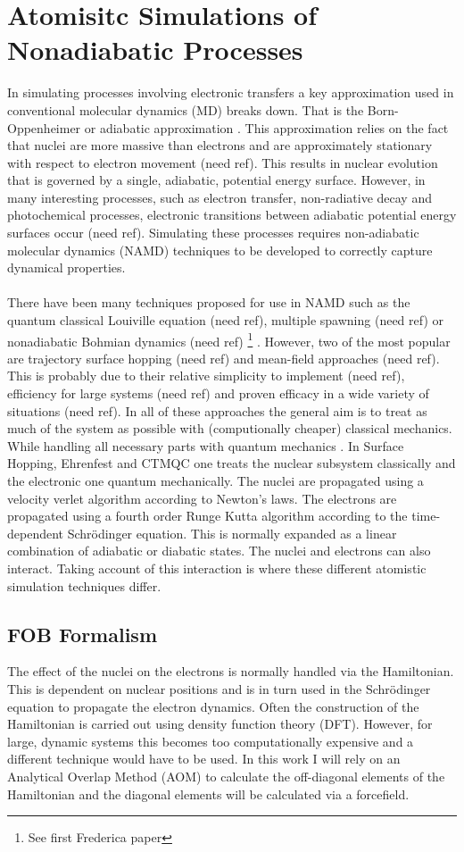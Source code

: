\section{Atomisitc Simulations of Nonadiabatic Processes}
In simulating processes involving electronic transfers a key approximation used in conventional molecular dynamics (MD) breaks down. That is the Born-Oppenheimer or adiabatic approximation \cite{john_c._tully_nonadiabatic_nodate}. This approximation relies on the fact that nuclei are more massive than electrons and are approximately stationary with respect to electron movement (need ref). This results in nuclear evolution that is governed by a single, adiabatic, potential energy surface. However, in many interesting processes, such as electron transfer, non-radiative decay and photochemical processes, electronic transitions between adiabatic potential energy surfaces occur (need ref). Simulating these processes requires non-adiabatic molecular dynamics (NAMD) techniques to be developed to correctly capture dynamical properties.
\\\\
There have been many techniques proposed for use in NAMD such as the quantum classical Louiville equation (need ref), multiple spawning (need ref) or nonadiabatic Bohmian dynamics (need ref) \footnote{See first Frederica paper} . However, two of the most popular are trajectory surface hopping (need ref) and mean-field approaches (need ref). This is probably due to their relative simplicity to implement (need ref), efficiency for large systems (need ref) and proven efficacy in a wide variety of situations (need ref). In all of these approaches the general aim is to treat as much of the system as possible with (computionally cheaper) classical mechanics. While handling all necessary parts with quantum mechanics \cite{Coker1995Jan}. In Surface Hopping, Ehrenfest and CTMQC one treats the nuclear subsystem classically and the electronic one quantum mechanically. The nuclei are propagated using a velocity verlet algorithm according to Newton's laws. The electrons are propagated using a fourth order Runge Kutta algorithm according to the time-dependent Schr\"odinger equation. This is normally expanded as a linear combination of adiabatic or diabatic states. The nuclei and electrons can also interact. Taking account of this interaction is where these different atomistic simulation techniques differ.
\subsection{FOB Formalism \label{sec:FOB-formalism}}
The effect of the nuclei on the electrons is normally handled via the Hamiltonian. This is dependent on nuclear positions and is in turn used in the Schr\"odinger equation to propagate the electron dynamics. Often the construction of the Hamiltonian is carried out using density function theory (DFT). However, for large, dynamic systems this becomes too computationally expensive and a different technique would have to be used. In this work I will rely on an Analytical Overlap Method (AOM) \cite{gajdos_ultrafast_2014} to calculate the off-diagonal elements of the Hamiltonian and the diagonal elements will be calculated via a forcefield.
